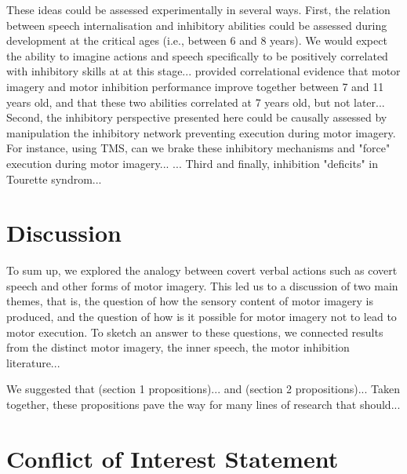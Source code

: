 \documentclass[utf8]{template/frontiersSCNS} %
\begin{document}
These ideas could be assessed experimentally in several ways. First, the relation between speech internalisation and inhibitory abilities could be assessed during development at the critical ages (i.e., between 6 and 8 years). We would expect the ability to imagine actions and speech specifically to be positively correlated with inhibitory skills at at this stage...  \cite{wang_relationship_2021} provided correlational evidence that motor imagery and motor inhibition performance improve together between 7 and 11 years old, and that these two abilities correlated at 7 years old, but not later... Second, the inhibitory perspective presented here could be causally assessed by manipulation the inhibitory network preventing execution during motor imagery. For instance, using TMS, can we brake these inhibitory mechanisms and "force" execution during motor imagery... \citep{angelini_motor_2015, angelini_proactive_2016}... Third and finally, inhibition "deficits" in Tourette syndrom...

\section{Discussion}


To sum up, we explored the analogy between covert verbal actions such as covert speech and other forms of motor imagery. This led us to a discussion of two main themes, that is, the question of how the sensory content of motor imagery is produced, and the question of how is it possible for motor imagery not to lead to motor execution. To sketch an answer to these questions, we connected results from the distinct motor imagery, the inner speech, the motor inhibition literature...

We suggested that (section 1 propositions)... and (section 2 propositions)... Taken together, these propositions pave the way for many lines of research that should...

\section*{Conflict of Interest Statement}

\end{document}
